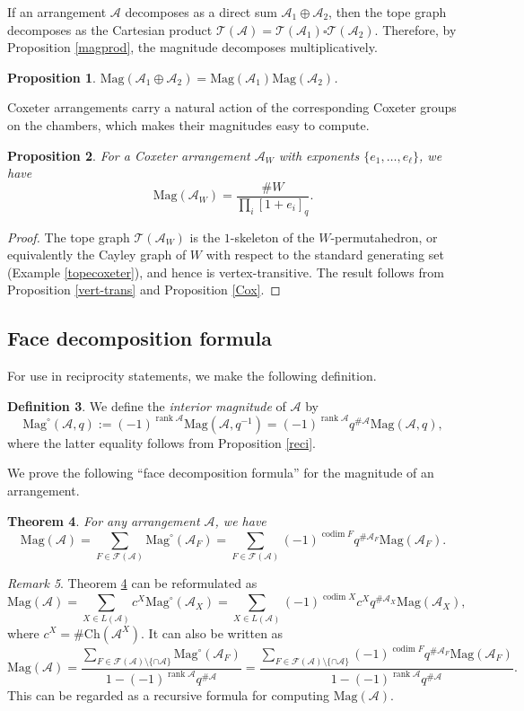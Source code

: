 \documentclass{amsart}
\numberwithin{equation}{section}
\newtheorem{thm}{Theorem}[section]
\newtheorem{prop}[thm]{Proposition}
\theoremstyle{plain}
\theoremstyle{remark}
\newtheorem{rem}[thm]{Remark}
\theoremstyle{definition}
\newtheorem{defn}[thm]{Definition}
\numberwithin{equation}{section}
\newcommand{\A}{\mathcal{A}}
\newcommand{\T}{\mathcal{T}}
\newcommand{\FF}{\mathcal{F}}
\newcommand{\Mag}{\mathrm{Mag}}
\newcommand{\Ch}{\mathrm{Ch}}
\DeclareMathOperator{\rank}{rank}
\DeclareMathOperator{\codim}{codim}
\begin{document}
If an arrangement $\A$ decomposes as a direct sum $\A_1\oplus\A_2$, then the tope graph decomposes as the Cartesian product $\T(\A)=\T(\A_1)\square\T(\A_2)$. Therefore, by Proposition \ref{magprod}, the magnitude decomposes multiplicatively.
\begin{prop}
    $\Mag(\A_1\oplus\A_2)=\Mag(\A_1)\Mag(\A_2)$.
\end{prop}

Coxeter arrangements carry a natural action of the corresponding Coxeter groups on the chambers, which makes their magnitudes easy to compute.
\begin{prop}\label{coxeter}
    For a Coxeter arrangement $\A_W$ with exponents $\{e_1,\ldots,e_{\ell}\}$, we have
    \[
    \Mag(\A_W)=\frac{\#W}{\prod_i[1+e_i]_q}.
    \]
\end{prop}
\begin{proof}
    The tope graph $\T(\A_W)$ is the $1$-skeleton of the $W$-permutahedron, or equivalently the Cayley graph of $W$ with respect to the standard generating set (Example \ref{topecoxeter}), and hence is vertex-transitive. The result follows from Proposition \ref{vert-trans} and Proposition \ref{Cox}.
\end{proof}

\subsection{Face decomposition formula}

For use in reciprocity statements, we make the following definition.
\begin{defn}\label{def:intmag}
    We define the \emph{interior magnitude} of $\A$ by
    \[
    \Mag^{\circ}(\A,q):=(-1)^{\rank \A}\Mag(\A,q^{-1})=(-1)^{\rank \A}q^{\#\A}\Mag(\A,q),
    \]
    where the latter equality follows from Proposition \ref{reci}.
\end{defn}

We prove the following ``face decomposition formula'' for the magnitude of an arrangement.

\begin{thm}\label{facedecomp}
    For any arrangement $\A$, we have
    \[
           \Mag(\A)=\sum_{F\in\FF(\A)}\Mag^{\circ}(\A_F)=\sum_{F\in\FF(\A)}(-1)^{\codim F}q^{\#\A_F}\Mag(\A_F).
    \]
\end{thm}

\begin{rem}
    Theorem \ref{facedecomp} can be reformulated as
    \[
    \Mag(\A)=\sum_{X\in L(\A)}c^X\Mag^{\circ}(\A_X)=\sum_{X\in L(\A)}(-1)^{\codim X}c^Xq^{\#\A_X}\Mag(\A_X),
    \]
    where $c^X=\#\Ch(\A^X)$.
    It can also be written as
    \[
    \Mag(\A)=\frac{\sum_{F\in\FF(\A)\setminus\{\cap\A\}}\Mag^{\circ}(\A_F)}{1-(-1)^{\rank \A}q^{\#\A}}=\frac{\sum_{F\in\FF(\A)\setminus\{\cap\A\}}(-1)^{\codim F}q^{\#\A_F}\Mag(\A_F)}{1-(-1)^{\rank \A}q^{\#\A}}.
    \]
    This can be regarded as a recursive formula for computing $\Mag(\A)$.
\end{rem}
\end{document}
